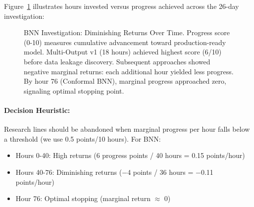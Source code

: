 Figure~\ref{fig:bnn-timeline-efficiency} illustrates hours invested versus progress achieved across the 26-day investigation:

\begin{figure}[htbp]
\centering
{}
\caption{BNN Investigation: Diminishing Returns Over Time. Progress score (0-10) measures cumulative advancement toward production-ready model. Multi-Output v1 (18 hours) achieved highest score (6/10) before data leakage discovery. Subsequent approaches showed negative marginal returns: each additional hour yielded less progress. By hour 76 (Conformal BNN), marginal progress approached zero, signaling optimal stopping point.}
\label{fig:bnn-timeline-efficiency}
\end{figure}

\paragraph{Decision Heuristic:}
Research lines should be abandoned when marginal progress per hour falls below a threshold (we use 0.5 points/10 hours). For BNN:
\begin{itemize}[itemsep=2pt,parsep=0pt]
    \item Hours 0-40: High returns (6 progress points / 40 hours = 0.15 points/hour)
    \item Hours 40-76: Diminishing returns (−4 points / 36 hours = −0.11 points/hour)
    \item Hour 76: Optimal stopping (marginal return $\approx$ 0)
\end{itemize}

